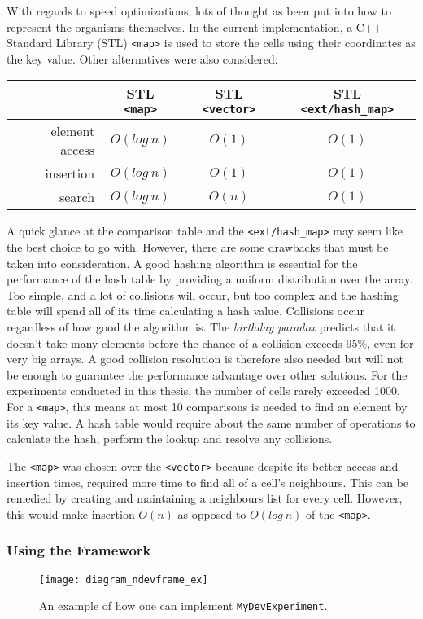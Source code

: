With regards to speed optimizations, lots of thought as been put into how to represent the organisms themselves. In the current implementation, a C++ Standard Library (STL) \texttt{<map>} is used to store the cells using their coordinates as the key value. Other alternatives were also considered:

\begin{center}
	\begin{tabular}{ r | c | c | c }
		~ & STL \texttt{<map>} & STL \texttt{<vector>} & STL \texttt{<ext/hash\_map>} \\
		\hline
		element access & $O(log~n)$ & $O(1)$ & $O(1)$ \\
		\hline
		insertion & $O(log~n)$ & $O(1)$ & $O(1)$ \\
		\hline
		search & $O(log~n)$ & $O(n)$ & $O(1)$ \\
	\end{tabular}
	\label{tbl:speed}
\end{center}

A quick glance at the comparison table and the \texttt{<ext/hash\_map>} may seem like the best choice to go with. However, there are some drawbacks that must be taken into consideration. A good hashing algorithm is essential for the performance of the hash table by providing a uniform distribution over the array. Too simple, and a lot of collisions will occur, but too complex and the hashing table will spend all of its time calculating a hash value. Collisions occur regardless of how good the algorithm is. The \emph{birthday paradox} predicts that it doesn't take many elements before the chance of a collision exceeds 95\%, even for very big arrays. A good collision resolution is therefore also needed but will not be enough to guarantee the performance advantage over other solutions. For the experiments conducted in this thesis, the number of cells rarely exceeded 1000. For a \texttt{<map>}, this means at most 10 comparisons is needed to find an element by its key value. A hash table would require about the same number of operations to calculate the hash, perform the lookup and resolve any collisions.

The \texttt{<map>} was chosen over the \texttt{<vector>} because despite its better access and insertion times, required more time to find all of a cell's neighbours. This can be remedied by creating and maintaining a neighbours list for every cell. However, this would make insertion $O(n)$ as opposed to $O(log~n)$ of the \texttt{<map>}.

\subsubsection{Using the Framework}
\begin{figure}[!ht]
	\centering
	\texttt{[image: diagram\_ndevframe\_ex]}
	\caption{An example of how one can implement \texttt{MyDevExperiment}.}
	\label{fig:diagram_ndevframe_ex}
\end{figure}

